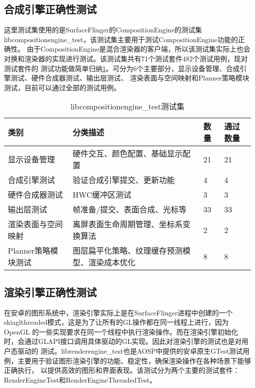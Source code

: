 \subsection{合成引擎正确性测试}
\label{sec:合成引擎正确性测试}
这里测试集使用的是SurfaceFlinger的CompositionEngine的测试集libcompositionengine\_test，该测试集主要用于测试CompositionEngine功能的正确性。
由于CompositionEngine是混合渲染器的客户端，所以该测试集实际上也会对换和渲染器的实现进行测试。该测试集共有71个测试套件482个测试用例，现对测试套件的
测试功能做简单归纳\ref{tab:libcompositionengine_test测试集}。可分为6个主要部分，显示设备管理、合成引擎测试、硬件合成器测试、输出层测试、
渲染表面与空间映射和Planner策略模块测试，目前可以通过全部的测试用例。

\begin{table}[h]
    \centering
    \caption{libcompositionengine\_test测试集}
    \label{tab:libcompositionengine_test测试集}
    \begin{tabular}{llll}
      \toprule
      类别 &  分类描述 & 数量 & 通过数量\\
      \midrule
      显示设备管理 & 硬件交互、颜色配置、基础显示配置 & 21 & 21\\
      合成引擎测试 & 验证合成引擎提交、更新功能 & 4 & 4\\
      硬件合成器测试 & HWC缓冲区测试 & 3 & 3\\
      输出层测试 & 帧准备/提交、表面合成、光标等  & 33 & 33\\
      渲染表面与空间映射 & 	离屏表面生命周期管理、坐标系变换算法 & 2 & 2\\
      Planner策略模块测试 & 图层扁平化策略、纹理缓存预测模型、渲染成本优化 & 8 & 8\\
      \bottomrule
    \end{tabular}
    \note{}
\end{table}


\subsection{渲染引擎正确性测试}
\label{sec:渲染引擎正确性测试}
在安卓的图形系统中，渲染引擎实际上是在SurfaceFlinger进程中创建的一个skiaglthreaded模式，这是为了让所有的GL操作都在同一线程上进行，因为
OpenGL 的一些实现要求在同一个线程中执行渲染操作。而在渲染引擎初始化时，会通过GLAPI接口调用具体驱动的GL实现。因此对渲染引擎的测试也是对用户态驱动的
测试。librenderengine\_test也是AOSP中提供的安卓原生GTest测试用例，主要用于验证图形渲染引擎的功能、稳定性，确保渲染操作在各种场景下能够正确执行，
以提供高效的图形和界面表现。该测试分为两个主要的测试套件：RenderEngineTest和RenderEngineThreadedTest。

